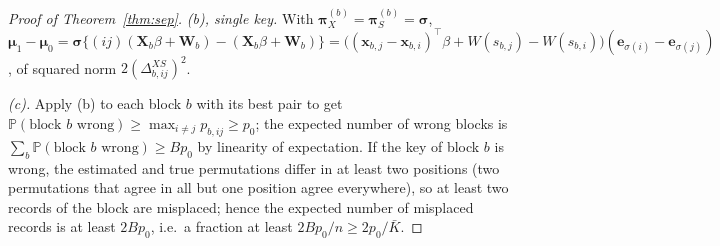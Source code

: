 \documentclass[11pt]{article}
\theoremstyle{definition}
\newcommand{\bX}{\mathbf{X}}
\newcommand{\bx}{\bm{x}}\newcommand{\bg}{\bm{g}}\newcommand{\bw}{\bm{w}}\newcommand{\bz}{\bm{z}}
\newcommand{\bW}{\mathbf{W}}
\newcommand{\bmu}{\boldsymbol{\mu}}
\newcommand{\bpi}{\boldsymbol{\pi}}
\newcommand{\bsigma}{\boldsymbol{\sigma}}
\newcommand{\Prob}{\mathbb{P}}
\begin{document}
\begin{proof}[Proof of Theorem~\ref{thm:sep}]
\emph{(b), single key.} With $\bpi_X^{(b)}=\bpi_S^{(b)}=\bsigma$, $\bmu_1-\bmu_0=\bsigma\{(ij)(\bX_b\beta+\bW_b)-(\bX_b\beta+\bW_b)\}=\big((\bx_{b,j}-\bx_{b,i})^\top\beta+W(s_{b,j})-W(s_{b,i})\big)(\bm e_{\sigma(i)}-\bm e_{\sigma(j)})$, of squared norm $2(\Delta^{XS}_{b,ij})^2$.

\emph{(c).} Apply (b) to each block $b$ with its best pair to get $\Prob(\text{block $b$ wrong})\ge\max_{i\ne j}p_{b,ij}\ge p_0$; the expected number of wrong blocks is $\sum_b\Prob(\text{block $b$ wrong})\ge Bp_0$ by linearity of expectation. If the key of block $b$ is wrong, the estimated and true permutations differ in at least two positions (two permutations that agree in all but one position agree everywhere), so at least two records of the block are misplaced; hence the expected number of misplaced records is at least $2Bp_0$, i.e.\ a fraction at least $2Bp_0/n\ge2p_0/\bar K$.


\end{proof}
\end{document}
